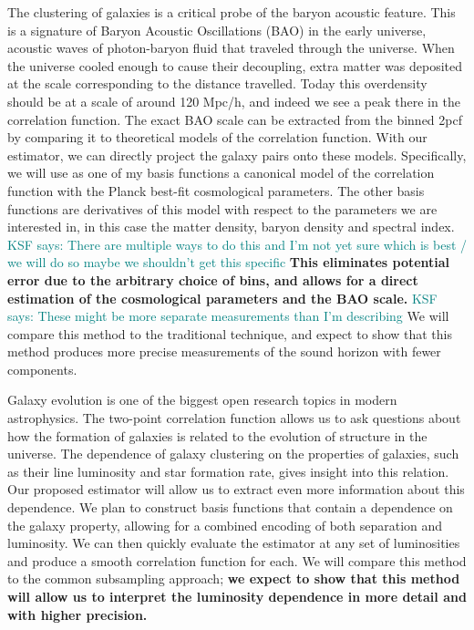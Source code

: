 \documentclass[12pt, fullpage, letterpaper]{article}
\newcommand{\KSF}[1]{\textcolor{teal}{KSF says: #1}}
\newcommand{\cf}{2pcf\xspace}
\begin{document}
The clustering of galaxies is a critical probe of the baryon acoustic feature. 
This is a signature of Baryon Acoustic Oscillations (BAO) in the early universe, acoustic waves of photon-baryon fluid that traveled through the universe. 
When the universe cooled enough to cause their decoupling, extra matter was deposited at the scale corresponding to the distance travelled. 
Today this overdensity should be at a scale of around 120 Mpc/h, and indeed we see a peak there in the correlation function. 
The exact BAO scale can be extracted from the binned \cf by comparing it to theoretical models of the correlation function. 
With our estimator, we can directly project the galaxy pairs onto these models. 
Specifically, we will use as one of my basis functions a canonical model of the correlation function with the Planck best-fit cosmological parameters. 
The other basis functions are derivatives of this model with respect to the parameters we are interested in, in this case the matter density, baryon density and spectral index. \KSF{There are multiple ways to do this and I'm not yet sure which is best / we will do so maybe we shouldn't get this specific}
\textbf{This eliminates potential error due to the arbitrary choice of bins, and allows for a direct estimation of the cosmological parameters and the BAO scale.} \KSF{These might be more separate measurements than I'm describing}
We will compare this method to the traditional technique, and expect to show that this method produces more precise measurements of the sound horizon with fewer components.

Galaxy evolution is one of the biggest open research topics in modern astrophysics.
The two-point correlation function allows us to ask questions about how the formation of galaxies is related to the evolution of structure in the universe.
The dependence of galaxy clustering on the properties of galaxies, such as their line luminosity and star formation rate, gives insight into this relation.
Our proposed estimator will allow us to extract even more information about this dependence. 
We plan to construct basis functions that contain a dependence on the galaxy property, allowing for a combined encoding of both separation and luminosity. 
We can then quickly evaluate the estimator at any set of luminosities and produce a smooth correlation function for each. 
We will compare this method to the common subsampling approach; \textbf{we expect to show that this method will allow us to interpret the luminosity dependence in more detail and with higher precision.}
\end{document}
